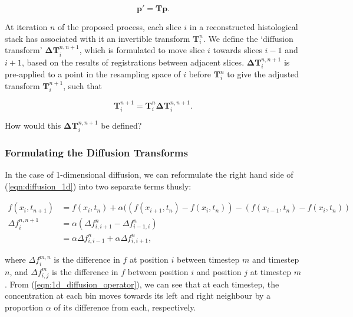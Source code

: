   		\begin{equation}
  			\mathbf{p'} = \mathbf{Tp}.
  		\end{equation}
      
  		At iteration $n$ of the proposed process, each slice $i$ in a reconstructed histological stack has associated with it an invertible transform $\mathbf{T}_i^n$. We define the `diffusion transform' $\mathbf{\Delta T}_i^{n,n+1}$, which is formulated to move slice $i$ towards slices $i-1$ and $i+1$, based on the results of registrations between adjacent slices. $\mathbf{\Delta T}_i^{n,n+1}$ is pre-applied to a point in the resampling space of $i$ before $\mathbf{T}_i^n$ to give the adjusted transform $\mathbf{T}_i^{n+1}$, such that
		  
    	\begin{equation}
  			\mathbf{T}_i^{n+1} = \mathbf{T}_i^n \mathbf{\Delta T}_i^{n,n+1}. \label{eqn:adjusted_transforms}
  		\end{equation}
		  
	  How would this $\mathbf{\Delta T}_i^{n,n+1}$ be defined?
		
    
    \subsubsection{Formulating the Diffusion Transforms} %
    \label{ssub:formulating_the_diffusion_transforms}
      In the case of 1-dimensional diffusion, we can reformulate the right hand side of (\ref{eqn:diffusion_1d}) into two separate terms thusly:
     
	  \begin{align}
	    f(x_i, t_{n+1}) &= f(x_i, t_n) + \alpha ((f(x_{i+1}, t_n) - f(x_i, t_n)) - (f(x_{i-1}, t_n) - f(x_i, t_n)) \\
			\Delta f_i^{n,n+1} &= \alpha (\Delta f_{i,i+1}^n - \Delta f_{i-1,i}^n) \\
			                   &= \alpha \Delta f_{i,i-1}^n + \alpha \Delta f_{i,i+1}^n, \label{eqn:1d_diffusion_operator}
		\end{align}
		
    where $\Delta f_i^{m,n}$ is the difference in $f$ at position $i$ between timestep $m$ and timestep $n$, and $\Delta f_{i,j}^m$ is the difference in $f$ between position $i$ and position $j$ at timestep $m$. From (\ref{eqn:1d_diffusion_operator}), we can see that at each timestep, the concentration at each bin moves towards its left and right neighbour by a proportion $\alpha$ of its difference from each, respectively.
		
